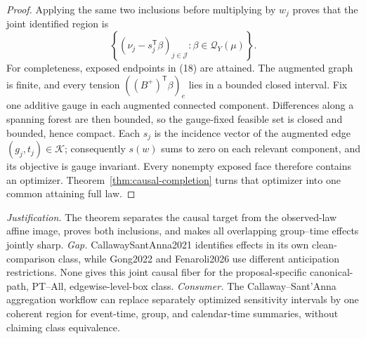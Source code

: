 \documentclass{article}
\begin{document}
\begin{proof}
Applying the same two inclusions before multiplying by \(w_j\) proves that the joint identified region is
\[
 \left\{(\nu_j-s_j^{\mathsf T}\beta)_{j\in\mathcal J}:
 \beta\in\mathcal Q_Y(\mu)\right\}.
\tag{18}
\]
For completeness, exposed endpoints in (18) are attained.  The augmented graph is finite, and every tension \(((B^+)^{\mathsf T}\beta)_e\) lies in a bounded closed interval.  Fix one additive gauge in each augmented connected component.  Differences along a spanning forest are then bounded, so the gauge-fixed feasible set is closed and bounded, hence compact.  Each \(s_j\) is the incidence vector of the augmented edge \((g_j,t_j)\in\mathcal K\); consequently \(s(w)\) sums to zero on each relevant component, and its objective is gauge invariant.  Every nonempty exposed face therefore contains an optimizer.  Theorem~\ref{thm:causal-completion} turns that optimizer into one common attaining full law.
\end{proof}
\par\smallskip\noindent \textit{Justification.} The theorem separates the causal target from the observed-law affine image, proves both inclusions, and makes all overlapping group--time effects jointly sharp. \textit{Gap.} CallawaySantAnna2021 identifies effects in its own clean-comparison class, while Gong2022 and Fenaroli2026 use different anticipation restrictions. None gives this joint causal fiber for the proposal-specific canonical-path, PT--All, edgewise-level-box class. \textit{Consumer.} The Callaway--Sant'Anna aggregation workflow can replace separately optimized sensitivity intervals by one coherent region for event-time, group, and calendar-time summaries, without claiming class equivalence.
\end{document}
